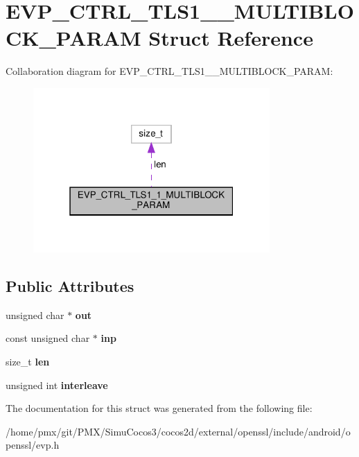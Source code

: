 \hypertarget{structEVP__CTRL__TLS1__1__MULTIBLOCK__PARAM}{}\section{E\+V\+P\+\_\+\+C\+T\+R\+L\+\_\+\+T\+L\+S1\+\_\+\_\+\+M\+U\+L\+T\+I\+B\+L\+O\+C\+K\+\_\+\+P\+A\+R\+AM Struct Reference}
\label{structEVP__CTRL__TLS1__1__MULTIBLOCK__PARAM}


Collaboration diagram for E\+V\+P\+\_\+\+C\+T\+R\+L\+\_\+\+T\+L\+S1\+\_\+\_\+\+M\+U\+L\+T\+I\+B\+L\+O\+C\+K\+\_\+\+P\+A\+R\+AM\+:
\nopagebreak
\begin{figure}[H]
\begin{center}
\leavevmode
\includegraphics[width=256pt]{structEVP__CTRL__TLS1__1__MULTIBLOCK__PARAM__coll__graph}
\end{center}
\end{figure}
\subsection*{Public Attributes}
\begin{DoxyCompactItemize}
\item 
\mbox{\label{structEVP__CTRL__TLS1__1__MULTIBLOCK__PARAM_a7297dad02a5f48fa751b4a3064d4db9c}} 
unsigned char $\ast$ {\bfseries out}
\item 
\mbox{\label{structEVP__CTRL__TLS1__1__MULTIBLOCK__PARAM_ae50c7e0410e7c84e778905c6fa3630ea}} 
const unsigned char $\ast$ {\bfseries inp}
\item 
\mbox{\label{structEVP__CTRL__TLS1__1__MULTIBLOCK__PARAM_aac2117b25ff219d7431a4f15f8ab81c9}} 
size\+\_\+t {\bfseries len}
\item 
\mbox{\label{structEVP__CTRL__TLS1__1__MULTIBLOCK__PARAM_abe0d5bc3e99172fd6aae016f727994da}} 
unsigned int {\bfseries interleave}
\end{DoxyCompactItemize}


The documentation for this struct was generated from the following file\+:\begin{DoxyCompactItemize}
\item 
/home/pmx/git/\+P\+M\+X/\+Simu\+Cocos3/cocos2d/external/openssl/include/android/openssl/evp.\+h\end{DoxyCompactItemize}
